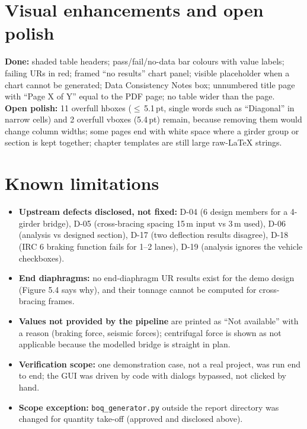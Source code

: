\documentclass[10pt,a4paper]{article}
\newcommand{\f}[1]{\texttt{#1}}
\begin{document}
\section{Visual enhancements and open polish}
\textbf{Done:} shaded table headers; pass/fail/no-data bar colours with value labels; failing URs in red; framed ``no results'' chart panel; visible placeholder when a chart cannot be generated; Data Consistency Notes box; unnumbered title page with ``Page X of Y'' equal to the PDF page; no table wider than the page.\\
\textbf{Open polish:} 11 overfull hboxes ($\le$\,5.1\,pt, single words such as ``Diagonal'' in narrow cells) and 2 overfull vboxes (5.4\,pt) remain, because removing them would change column widths; some pages end with white space where a girder group or section is kept together; chapter templates are still large raw-LaTeX strings.

\section{Known limitations}
\begin{itemize}
\item \textbf{Upstream defects disclosed, not fixed:} D-04 (6 design members for a 4-girder bridge), D-05 (cross-bracing spacing 15\,m input vs 3\,m used), D-06 (analysis vs designed section), D-17 (two deflection results disagree), D-18 (IRC 6 braking function fails for 1--2 lanes), D-19 (analysis ignores the vehicle checkboxes).
\item \textbf{End diaphragms:} no end-diaphragm UR results exist for the demo design (Figure 5.4 says why), and their tonnage cannot be computed for cross-bracing frames.
\item \textbf{Values not provided by the pipeline} are printed as ``Not available'' with a reason (braking force, seismic forces); centrifugal force is shown as not applicable because the modelled bridge is straight in plan.
\item \textbf{Verification scope:} one demonstration case, not a real project, was run end to end; the GUI was driven by code with dialogs bypassed, not clicked by hand.
\item \textbf{Scope exception:} \f{boq\_generator.py} outside the report directory was changed for quantity take-off (approved and disclosed above).
\end{itemize}
\end{document}
